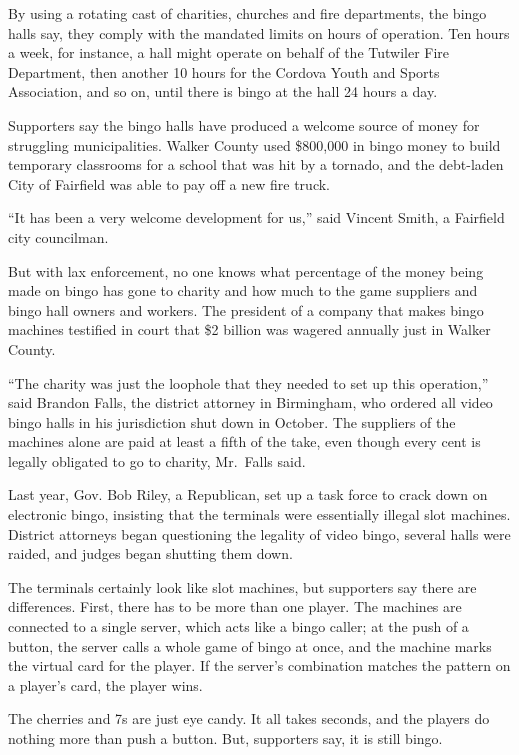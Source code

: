 ﻿\documentclass[12pt]{article}
\begin{document}
By using a rotating cast of charities, churches and fire departments, the bingo halls say, they
comply with the mandated limits on hours of operation. Ten hours a week, for instance, a hall might
operate on behalf of the Tutwiler Fire Department, then another 10 hours for the Cordova Youth and
Sports Association, and so on, until there is bingo at the hall 24 hours a day.

Supporters say the bingo halls have produced a welcome source of money for struggling
municipalities. Walker County used \$800,000 in bingo money to build temporary classrooms for a
school that was hit by a tornado, and the debt-laden City of Fairfield was able to pay off a new
fire truck.

``It has been a very welcome development for us,'' said Vincent Smith, a Fairfield city councilman.

But with lax enforcement, no one knows what percentage of the money being made on bingo has gone to
charity and how much to the game suppliers and bingo hall owners and workers. The president of a
company that makes bingo machines testified in court that \$2 billion was wagered annually just in
Walker County.

``The charity was just the loophole that they needed to set up this operation,'' said Brandon Falls,
the district attorney in Birmingham, who ordered all video bingo halls in his jurisdiction shut down
in October. The suppliers of the machines alone are paid at least a fifth of the take, even though
every cent is legally obligated to go to charity, Mr.~Falls said.

Last year, Gov. Bob Riley, a Republican, set up a task force to crack down on electronic bingo,
insisting that the terminals were essentially illegal slot machines. District attorneys began
questioning the legality of video bingo, several halls were raided, and judges began shutting them
down.

The terminals certainly look like slot machines, but supporters say there are differences. First,
there has to be more than one player. The machines are connected to a single server, which acts like
a bingo caller; at the push of a button, the server calls a whole game of bingo at once, and the
machine marks the virtual card for the player. If the server's combination matches the pattern on a
player's card, the player wins.

The cherries and 7s are just eye candy. It all takes seconds, and the players do nothing more than
push a button. But, supporters say, it is still bingo.
\end{document}
